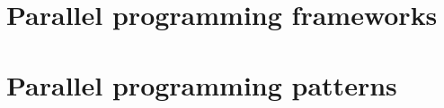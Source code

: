 \documentclass[12pt, a4paper]{report}
\begin{document}
    \chapter{Parallel programming frameworks}
    
    
    
    

    \chapter{Parallel programming patterns}
    
    
    
    
    
    
    
    
\end{document}
